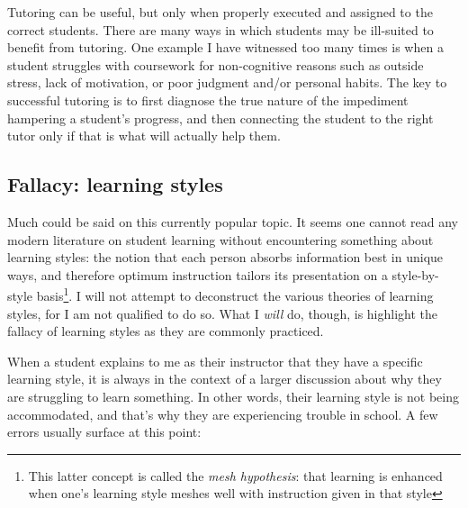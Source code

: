 Tutoring can be useful, but only when properly executed and assigned to the correct students.  There are many ways in which students may be ill-suited to benefit from tutoring.  One example I have witnessed too many times is when a student struggles with coursework for non-cognitive reasons such as outside stress, lack of motivation, or poor judgment and/or personal habits.  The key to successful tutoring is to first diagnose the true nature of the impediment hampering a student's progress, and then connecting the student to the right tutor only if that is what will actually help them.






\subsection{Fallacy: learning styles}

Much could be said on this currently popular topic.  It seems one cannot read any modern literature on student learning without encountering something about learning styles: the notion that each person absorbs information best in unique ways, and therefore optimum instruction tailors its presentation on a style-by-style basis\footnote{This latter concept is called the \textit{mesh hypothesis}: that learning is enhanced when one's learning style meshes well with instruction given in that style}.  I will not attempt to deconstruct the various theories of learning styles, for I am not qualified to do so.  What I \textit{will} do, though, is highlight the fallacy of learning styles as they are commonly practiced.

When a student explains to me as their instructor that they have a specific learning style, it is always in the context of a larger discussion about why they are struggling to learn something.  In other words, their learning style is not being accommodated, and that's why they are experiencing trouble in school.  A few errors usually surface at this point:


